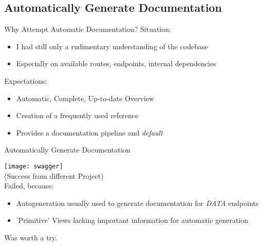\subsection{Automatically Generate Documentation}

\begin{frame}[c]{Why Attempt Automatic Documentation?} 
    \large
    Situation:
    \begin{itemize}[<+(1)->]
        \item I had still only a rudimentary understanding of the codebase
        \item Especially on available routes, endpoints, internal dependencies
    \end{itemize}
    \pause
    Expectations:
    \begin{itemize}[<+(1)->]
        \item Automatic, Complete, Up-to-date Overview
        \item Creation of a frequently used reference
        \item Provides a documentation pipeline and {\em default}
    \end{itemize}
\end{frame}

\begin{frame}[c]{Automatically Generate Documentation}
    \begin{multicols}{2}
        \texttt{[image: swagger]} \\
        (Success from different Project) \\
        \large
        \pause
        Failed, because:
        \begin{itemize}[<+(1)->]
            \item Autogeneration usually used to generate documentation for {\em DATA} endpoints
            \item 'Primitive' Views lacking important information for automatic generation
        \end{itemize}
        \pause
        Was worth a try.
    \end{multicols}
\end{frame}

